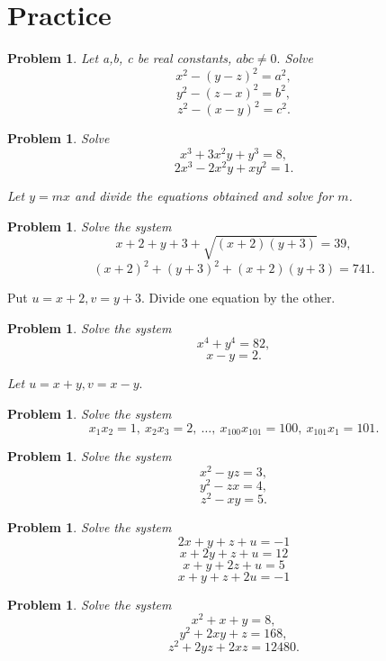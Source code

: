\documentclass[11pt, openany]{book}
\theoremstyle{change} \theoremheaderfont{\blue\sffamily\bfseries}
\newtheorem{pro}[thm]{Problem}
\theoremstyle{nonumberplain} \theoremheaderfont{\sffamily\bfseries}
\newcommand{\í}{\'{\i}}
\begin{document}
\section*{Practice}\begin{multicols}{2}\columnseprule 1pt \columnsep 25pt
\begin{pro} Let  a,b, c be real constants, $abc \neq 0.$ Solve
$$x^2 - (y - z)^2 = a^2,$$
$$y^2 - (z - x)^2 = b^2,$$
$$z^2 - (x - y)^2 = c^2.$$\end{pro}
\begin{pro} Solve
$$x^3 + 3x^2y + y^3 = 8,$$
$$2x^3 - 2x^2y + xy^2 = 1.$$
\begin{answer}Let $y = mx$ and divide the equations obtained and solve for
$m$.  \end{answer}
\end{pro}

\begin{pro} Solve the system
$$x + 2 + y + 3 + \sqrt{(x + 2)(y + 3)} = 39,$$
$$(x + 2)^2 + (y + 3)^2 + (x + 2)(y + 3)= 741.$$\end{pro}
\begin{answer} Put $u = x + 2, v = y + 3.$ Divide one equation by the
other. \end{answer}
\begin{pro} Solve the system
$$x^4 + y^4 = 82,$$ $$x - y = 2.$$
\begin{answer} Let $u = x + y, v = x - y.$
\end{answer}
\end{pro}

\begin{pro} Solve the system
$$x_1x_2 = 1, \ x_2x_3 = 2,\ \ldots , \ x_{100}x_{101} = 100,\ x_{101}x_1 = 101.$$
\end{pro}
\begin{pro} Solve the system
$$x^2 - yz = 3,$$
$$y^2 - zx = 4,$$
$$z^2 - xy = 5.$$
\end{pro}
\begin{pro} Solve  the system
$$2x + y + z + u  = -1$$
$$x + 2y + z + u  = 12$$
$$x + y + 2z + u  = 5$$
$$x + y + z + 2u  = -1$$

\end{pro}
\begin{pro} Solve the system
$$x^2 + x + y = 8,$$
$$y^2 + 2xy + z = 168,$$
$$z^2 + 2yz + 2xz = 12480.$$
\end{pro}
\end{multicols}
\end{document}
